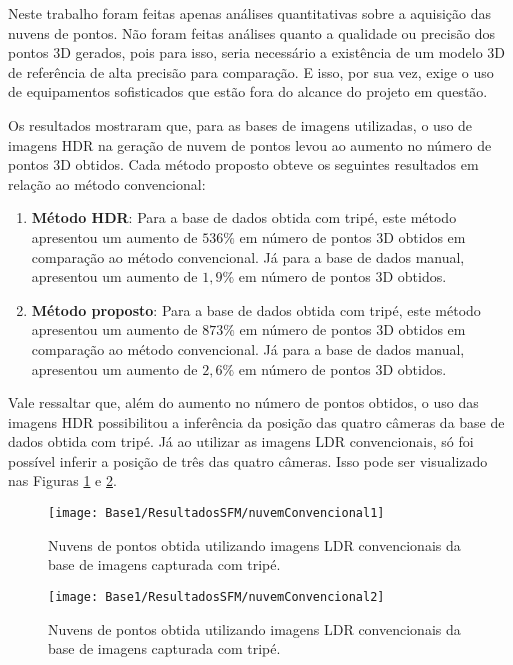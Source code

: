 Neste trabalho foram feitas apenas análises quantitativas sobre a aquisição das nuvens de pontos. Não foram feitas análises quanto a qualidade ou precisão dos pontos 3D gerados, pois para isso, seria necessário a existência de um modelo 3D de referência de alta precisão para comparação. E isso, por sua vez, exige o uso de equipamentos sofisticados que estão fora do alcance do projeto em questão.

Os resultados mostraram que, para as bases de imagens utilizadas, o uso de imagens HDR na geração de nuvem de pontos levou ao aumento no número de pontos 3D obtidos. Cada método proposto obteve os seguintes resultados em relação ao método convencional:

\begin{enumerate}
\item \textbf{Método HDR}: Para a base de dados obtida com tripé, este método apresentou um aumento de $536\%$ em número de pontos 3D obtidos em comparação ao método convencional. Já para a base de dados manual, apresentou um aumento de $1,9\%$ em número de pontos 3D obtidos.

\item \textbf{Método proposto}: Para a base de dados obtida com tripé, este método apresentou um aumento de $873\%$ em número de pontos 3D obtidos em comparação ao método convencional. Já para a base de dados manual, apresentou um aumento de $2,6\%$ em número de pontos 3D obtidos.
\end{enumerate}

Vale ressaltar que, além do aumento no número de pontos obtidos, o uso das imagens HDR possibilitou a inferência da posição das quatro câmeras da base de dados obtida com tripé. Já ao utilizar as imagens LDR convencionais, só foi possível inferir a posição de três das quatro câmeras. Isso pode ser visualizado nas Figuras \ref{figNuvemPontosA} e \ref{figNuvemPontosA2}.

\begin{figure}[H]
  \centering 
  \texttt{[image: Base1/ResultadosSFM/nuvemConvencional1]} 
  \caption{Nuvens de pontos obtida utilizando imagens LDR convencionais da base de imagens capturada com tripé.}
  \label{figNuvemPontosA}
\end{figure}

\begin{figure}[H]
  \centering 
  \texttt{[image: Base1/ResultadosSFM/nuvemConvencional2]} 
  \caption{Nuvens de pontos obtida utilizando imagens LDR convencionais da base de imagens capturada com tripé.}
  \label{figNuvemPontosA2}
\end{figure}

